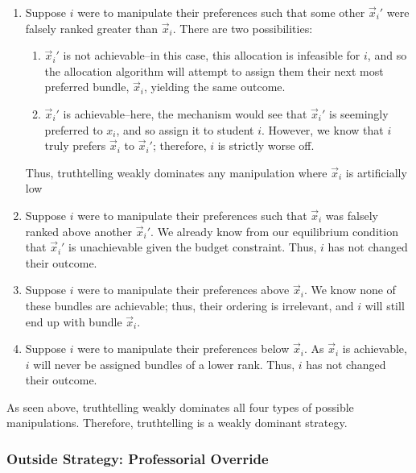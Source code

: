 \documentclass{article}
\renewcommand{\v}{\vec{x}}
\begin{document}
\begin{enumerate}

\item Suppose $i$ were to manipulate their preferences such that some other $\vec{x}_i'$ were falsely ranked greater than $\vec{x}_i$. There are two possibilities:
\begin{enumerate}
    \item $\vec{x}_i'$ is not achievable--in this case, this allocation is infeasible for $i$, and so the allocation algorithm will attempt to assign them their next most preferred bundle, $\vec{x}_i$, yielding the same outcome.
    
    \item $\vec{x}_i'$ is achievable--here, the mechanism would see that $\vec{x}_i'$ is seemingly preferred to $x_i$, and so assign it to student $i$. However, we know that $i$ truly prefers $\vec{x}_i$ to $\vec{x}_i'$; therefore, $i$ is strictly worse off.
\end{enumerate}

Thus, truthtelling weakly dominates any manipulation where $\v_i$ is artificially low

\item Suppose $i$ were to manipulate their preferences such that $\vec{x}_i$ was falsely ranked above another $\vec{x}_i'$. We already know from our equilibrium condition that $\v_i'$ is unachievable given the budget constraint. Thus, $i$ has not changed their outcome.

\item Suppose $i$ were to manipulate their preferences above $\v_i$. We know none of these bundles are achievable; thus, their ordering is irrelevant, and $i$ will still end up with bundle $\v_i$. 

\item Suppose $i$ were to manipulate their preferences below $\v_i$. As $\v_i$ is achievable, $i$ will never be assigned bundles of a lower rank. Thus, $i$ has not changed their outcome. 

\end{enumerate}

As seen above, truthtelling weakly dominates all four types of possible manipulations. Therefore, truthtelling is a weakly dominant strategy. 

\subsubsection{Outside Strategy: Professorial Override}
\end{document}
